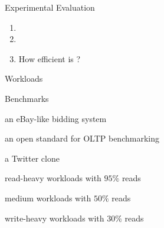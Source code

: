 \begin{frame}{Experimental Evaluation}
	\begin{center}
		\begin{enumerate}[(1)]
			\setlength{\itemsep}{15pt}
			\item {}
			\item {}
			\item {}
			  How efficient is \polysi?
		\end{enumerate}

	\end{center}
\end{frame}

\begin{frame}{Workloads}
	\begin{center}
		{}
	\end{center}
\end{frame}

\begin{frame}{Benchmarks}
	\begin{center}
		\begin{description}[GeneralRW:]
			\setlength{\itemsep}{10pt}
			\item[RuBiS:] an eBay-like bidding system
			\item[TPC-C:] an open standard for OLTP benchmarking
			\item[C-Twitter:] a Twitter clone
			\vspace{10pt}
			\item[GeneralRH:] read-heavy workloads with $95\%$ reads
			\item[GeneralRW:] medium workloads with $50\%$ reads
			\item[GeneralWH:] write-heavy workloads with $30\%$ reads
		\end{description}
	\end{center}
\end{frame}


